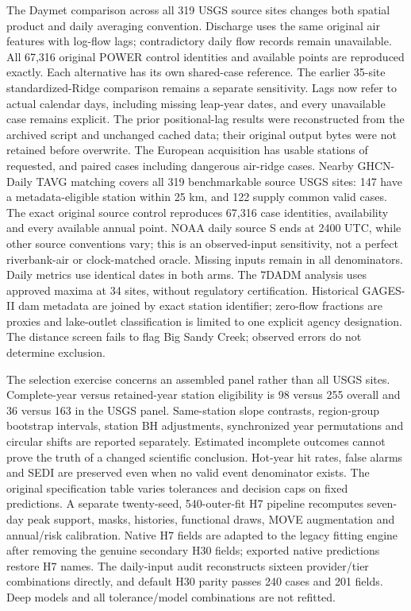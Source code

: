 \documentclass[draft]{agujournal2025}
\begin{document}
The Daymet comparison across all 319 USGS source sites changes both spatial product and daily averaging convention. Discharge uses the same original air features with log-flow lags; contradictory daily flow records remain unavailable. All 67,316 original POWER control identities and available points are reproduced exactly. Each alternative has its own shared-case reference. The earlier 35-site standardized-Ridge comparison remains a separate sensitivity. Lags now refer to actual calendar days, including missing leap-year dates, and every unavailable case remains explicit. The prior positional-lag results were reconstructed from the archived script and unchanged cached data; their original output bytes were not retained before overwrite. The European acquisition has \REuropeStations{} usable stations of \REuropeRequested{} requested, and \REuropeCases{} paired cases including \REuropeAirCases{} dangerous air-ridge cases. Nearby GHCN-Daily TAVG matching covers all 319 benchmarkable source USGS sites: 147 have a metadata-eligible station within 25 km, and 122 supply common valid cases. The exact original source control reproduces 67,316 case identities, availability and every available annual point. NOAA daily source S ends at 2400 UTC, while other source conventions vary; this is an observed-input sensitivity, not a perfect riverbank-air or clock-matched oracle. Missing inputs remain in all denominators. Daily metrics use identical dates in both arms. The 7DADM analysis uses approved maxima at 34 sites, without regulatory certification. Historical GAGES-II dam metadata are joined by exact station identifier; zero-flow fractions are proxies and lake-outlet classification is limited to one explicit agency designation. The distance screen fails to flag Big Sandy Creek; observed errors do not determine exclusion.

The selection exercise concerns an assembled panel rather than all USGS sites. Complete-year versus retained-year station eligibility is 98 versus 255 overall and 36 versus 163 in the USGS panel. Same-station slope contrasts, region-group bootstrap intervals, station BH adjustments, synchronized year permutations and circular shifts are reported separately. Estimated incomplete outcomes cannot prove the truth of a changed scientific conclusion. Hot-year hit rates, false alarms and SEDI are preserved even when no valid event denominator exists. The original specification table varies tolerances and decision caps on fixed predictions. A separate twenty-seed, 540-outer-fit H7 pipeline recomputes seven-day peak support, masks, histories, functional draws, MOVE augmentation and annual/risk calibration. Native H7 fields are adapted to the legacy fitting engine after removing the genuine secondary H30 fields; exported native predictions restore H7 names. The daily-input audit reconstructs sixteen provider/tier combinations directly, and default H30 parity passes 240 cases and 201 fields. Deep models and all tolerance/model combinations are not refitted.
\end{document}
